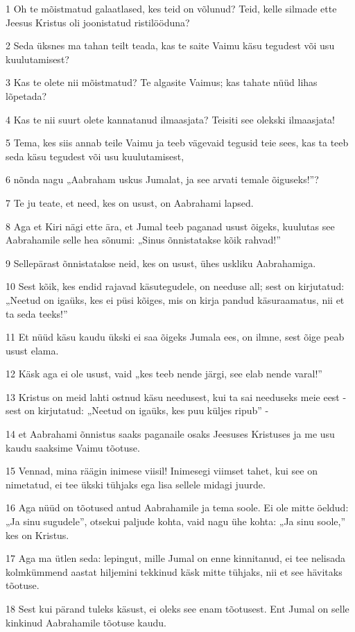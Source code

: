 \par 1 Oh te mõistmatud galaatlased, kes teid on võlunud? Teid, kelle silmade ette Jeesus Kristus oli joonistatud ristilööduna?
\par 2 Seda üksnes ma tahan teilt teada, kas te saite Vaimu käsu tegudest või usu kuulutamisest?
\par 3 Kas te olete nii mõistmatud? Te algasite Vaimus; kas tahate nüüd lihas lõpetada?
\par 4 Kas te nii suurt olete kannatanud ilmaasjata? Teisiti see olekski ilmaasjata!
\par 5 Tema, kes siis annab teile Vaimu ja teeb vägevaid tegusid teie sees, kas ta teeb seda käsu tegudest või usu kuulutamisest,
\par 6 nõnda nagu „Aabraham uskus Jumalat, ja see arvati temale õiguseks!”?
\par 7 Te ju teate, et need, kes on usust, on Aabrahami lapsed.
\par 8 Aga et Kiri nägi ette ära, et Jumal teeb paganad usust õigeks, kuulutas see Aabrahamile selle hea sõnumi: „Sinus õnnistatakse kõik rahvad!”
\par 9 Sellepärast õnnistatakse neid, kes on usust, ühes uskliku Aabrahamiga.
\par 10 Sest kõik, kes endid rajavad käsutegudele, on needuse all; sest on kirjutatud: „Neetud on igaüks, kes ei püsi kõiges, mis on kirja pandud käsuraamatus, nii et ta seda teeks!”
\par 11 Et nüüd käsu kaudu ükski ei saa õigeks Jumala ees, on ilmne, sest õige peab usust elama.
\par 12 Käsk aga ei ole usust, vaid „kes teeb nende järgi, see elab nende varal!”
\par 13 Kristus on meid lahti ostnud käsu needusest, kui ta sai needuseks meie eest - sest on kirjutatud: „Neetud on igaüks, kes puu küljes ripub” -
\par 14 et Aabrahami õnnistus saaks paganaile osaks Jeesuses Kristuses ja me usu kaudu saaksime Vaimu tõotuse.
\par 15 Vennad, mina räägin inimese viisil! Inimesegi viimset tahet, kui see on nimetatud, ei tee ükski tühjaks ega lisa sellele midagi juurde.
\par 16 Aga nüüd on tõotused antud Aabrahamile ja tema soole. Ei ole mitte öeldud: „Ja sinu sugudele”, otsekui paljude kohta, vaid nagu ühe kohta: „Ja sinu soole,” kes on Kristus.
\par 17 Aga ma ütlen seda: lepingut, mille Jumal on enne kinnitanud, ei tee nelisada kolmkümmend aastat hiljemini tekkinud käsk mitte tühjaks, nii et see hävitaks tõotuse.
\par 18 Sest kui pärand tuleks käsust, ei oleks see enam tõotusest. Ent Jumal on selle kinkinud Aabrahamile tõotuse kaudu.

